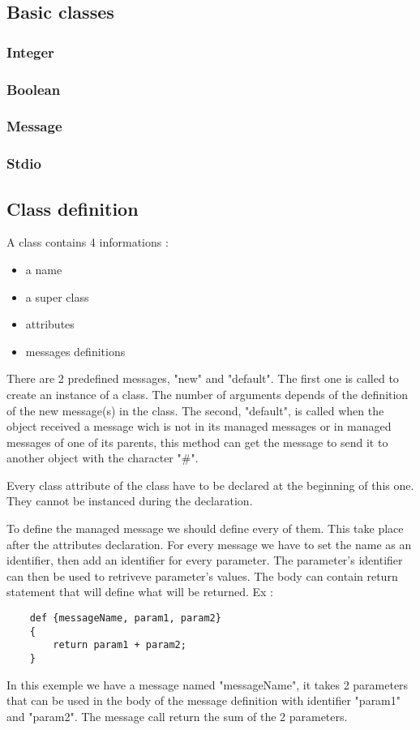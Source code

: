 \documentclass{eplDoc}
\begin{document}
\subsection{Basic classes}
\subsubsection{Integer}
\subsubsection{Boolean}
\subsubsection{Message}
\subsubsection{Stdio}


\subsection{Class definition}
A class contains 4 informations : 
\begin{itemize}
    \item a name
    \item a super class
    \item attributes 
    \item messages definitions
\end{itemize}

There are 2 predefined messages, "new" and "default".  The first one is called 
to create an instance of a class.  The number of arguments depends of the 
definition of the new message(s) in the class.  The second, "default", is called
when the object received a message wich is not in its managed messages or in 
managed messages of one of its parents, this method can get the message to send 
it to another object with the character "\#". 


Every class attribute of the class have to be declared at the beginning of this one.  
They cannot be instanced during the declaration.

To define the managed message we should define every of them.  This take place after the attributes declaration.  For every message we have to set the name as an identifier, then add an identifier for every parameter. The parameter's identifier can then be used to retriveve parameter's values. 
The body can contain return statement that will define what will be returned.
Ex : 
\begin{lstlisting}
    def {messageName, param1, param2}
    {
        return param1 + param2;
    }
\end{lstlisting}
In this exemple we have a message named "messageName", it takes 2 parameters that can be used in the body of the message definition with identifier "param1" and "param2".  The message call return the sum of the 2 parameters.
\end{document}
